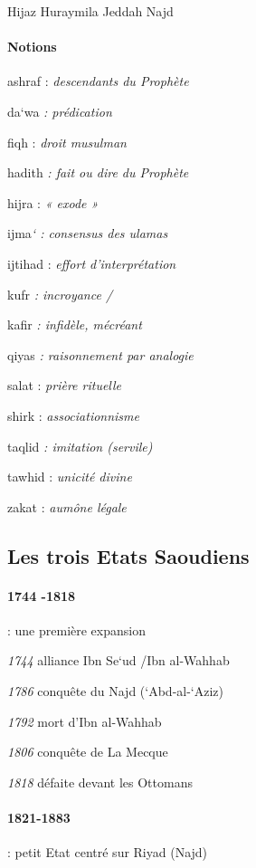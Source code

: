 Hijaz Huraymila Jeddah Najd

\paragraph{Notions}

ashraf : \emph{descendants du Prophète}

da`wa \emph{: prédication}

fiqh : \emph{droit musulman}

hadith \emph{: fait ou dire du Prophète}

hijra : \emph{« exode »}

ijma\emph{` : consensus des ulamas}

ijtihad : \emph{effort d'interprétation}

kufr \emph{: incroyance /} 

kafir \emph{: infidèle, mécréant}

qiyas \emph{: raisonnement par analogie}

salat : \emph{prière rituelle} 

shirk : \emph{associationnisme} 

taqlid
\emph{: imitation (servile)} 

tawhid : \emph{unicité divine}

zakat :
\emph{aumône légale}


 
\subsection{Les trois Etats Saoudiens} 

 
  {\paragraph{1744 -1818}: une première expansion}
 
 
\emph{1744} alliance Ibn Se`ud /Ibn al-Wahhab
 
\emph{1786} conquête du Najd (`Abd-al-`Aziz)
 
\emph{1792} mort d'Ibn al-Wahhab
 
\emph{1806} conquête de La Mecque
 
\emph{1818} défaite devant les Ottomans
 

 
  {\paragraph{1821-1883}: petit Etat centré sur Riyad (Najd)}
 
